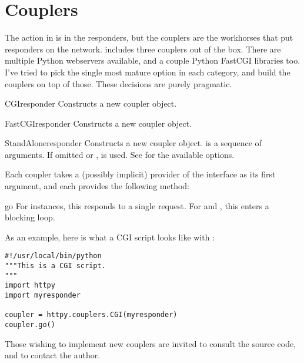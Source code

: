 \section{Couplers \label{couplers}}

The action in  is in the responders, but the couplers are the
workhorses that put responders on the network.  includes three
couplers out of the box. There are multiple Python webservers available, and a
couple Python FastCGI libraries too. I've tried to pick the single most mature
option in each category, and build the couplers on top of those. These decisions
are purely pragmatic.

\begin{classdesc}{CGI}{responder} Constructs a new  coupler object.
\end{classdesc}

\begin{classdesc}{FastCGI}{responder} Constructs a new  coupler
object.
\end{classdesc}

\begin{classdesc}{StandAlone}{responder} Constructs a new
 coupler object.  is a sequence of arguments. If
omitted or ,  is used. See  for the available options.
\end{classdesc}

Each coupler takes a (possibly implicit) provider of the 
interface as its first argument, and each provides the following method:

\begin{methoddesc}{go}{} For  instances, this responds to a single
request. For  and , this enters a blocking
loop.\end{methoddesc}

As an example, here is what a CGI script looks like with :

\begin{verbatim}
#!/usr/local/bin/python
"""This is a CGI script.
"""
import httpy
import myresponder

coupler = httpy.couplers.CGI(myresponder)
coupler.go()
\end{verbatim}

Those wishing to implement new couplers are invited to consult the source code,
and to contact the author.